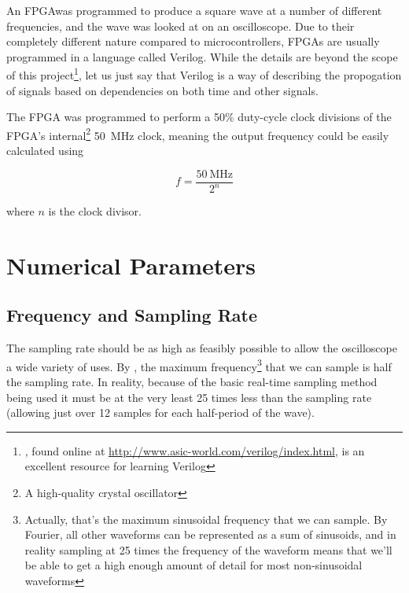 An FPGA\fdeffpga was programmed to produce a square wave at a number of
different frequencies, and the wave was looked at on an oscilloscope. Due to
their completely different nature compared to microcontrollers, FPGAs are
usually programmed in a language called Verilog. While the details are beyond
the scope of this project\footnote{\textcite{VerilogTutorial}, found online at
\url{http://www.asic-world.com/verilog/index.html}, is an excellent resource for
learning Verilog}, let us just say that Verilog is a way of describing the
propogation of signals based on dependencies on both time and other
signals\autocite{VerilogWiki}.

The FPGA was programmed to perform a 50\% duty-cycle clock divisions of the
FPGA's internal\footnote{A high-quality crystal oscillator} \SI{50}{\MHz} clock,
meaning the output frequency could be easily calculated using

\begin{equation*}
  f = \frac{\SI{50}{\MHz}}{2^n}
\end{equation*}

where $n$ is the clock divisor.


\section{Numerical Parameters}

\subsection*{Frequency and Sampling Rate}

The sampling rate should be as high as feasibly possible to allow the
oscilloscope a wide variety of uses. By \textcite{ShanonNyquist}, the maximum
frequency\footnote{Actually, that's the maximum sinusoidal frequency that we can
sample. By Fourier, all other waveforms can be represented as a sum of
sinusoids, and in reality sampling at 25 times the frequency of the waveform
means that we'll be able to get a high enough amount of detail for most
non-sinusoidal waveforms} that we can sample is half the sampling rate. In
reality, because of the basic real-time sampling method being used it must be at
the very least 25 times less than the sampling rate (allowing just over 12
samples for each half-period of the wave).

